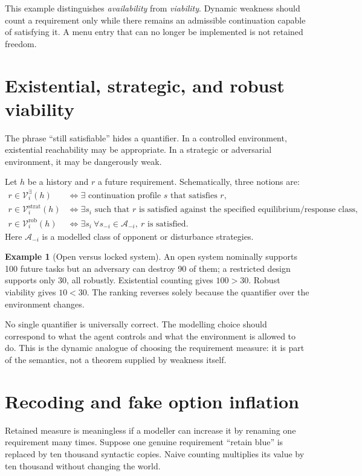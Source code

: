\documentclass[11pt]{article}
\theoremstyle{definition}
\newtheorem{example}[theorem]{Example}
\newcommand{\V}{\mathcal V}
\begin{document}
This example distinguishes \emph{availability} from \emph{viability}. Dynamic weakness should count a requirement only while there remains an admissible continuation capable of satisfying it. A menu entry that can no longer be implemented is not retained freedom.

\section{Existential, strategic, and robust viability}

The phrase ``still satisfiable'' hides a quantifier. In a controlled environment, existential reachability may be appropriate. In a strategic or adversarial environment, it may be dangerously weak.

Let $h$ be a history and $r$ a future requirement. Schematically, three notions are:
\begin{align*}
r\in\V_i^{\exists}(h)
&\iff \exists\text{ continuation profile }s\text{ that satisfies }r,\\
r\in\V_i^{\mathrm{strat}}(h)
&\iff \exists s_i\text{ such that }r\text{ is satisfied against the specified equilibrium/response class},\\
r\in\V_i^{\mathrm{rob}}(h)
&\iff \exists s_i\ \forall s_{-i}\in\mathcal A_{-i},\ r\text{ is satisfied}.
\end{align*}
Here $\mathcal A_{-i}$ is a modelled class of opponent or disturbance strategies.

\begin{example}[Open versus locked system]
An open system nominally supports 100 future tasks but an adversary can destroy 90 of them; a restricted design supports only 30, all robustly. Existential counting gives $100>30$. Robust viability gives $10<30$. The ranking reverses solely because the quantifier over the environment changes.
\end{example}

No single quantifier is universally correct. The modelling choice should correspond to what the agent controls and what the environment is allowed to do. This is the dynamic analogue of choosing the requirement measure: it is part of the semantics, not a theorem supplied by weakness itself.

\section{Recoding and fake option inflation}

Retained measure is meaningless if a modeller can increase it by renaming one requirement many times. Suppose one genuine requirement ``retain blue'' is replaced by ten thousand syntactic copies. Naive counting multiplies its value by ten thousand without changing the world.
\end{document}
